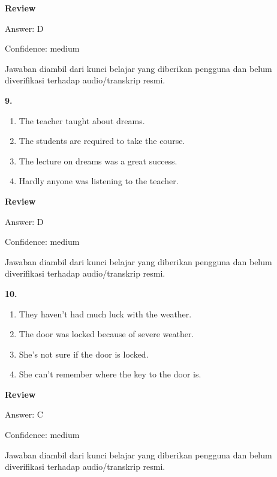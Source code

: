 \documentclass[12pt]{article}
\begin{document}
\par
\begingroup
\setlength{\parskip}{0pt}
\setlength{\parindent}{0pt}
\textbf{Review}\par
Answer: D\par
Confidence: medium\par
Jawaban diambil dari kunci belajar yang diberikan pengguna dan belum diverifikasi terhadap audio/transkrip resmi.\par
\endgroup
\par
\vspace{0.25\baselineskip}
\noindent\textbf{9.}
\begin{enumerate}[label=(\Alph*),leftmargin=*,itemsep=0.2em]
\item The teacher taught about dreams.
\item The students are required to take the course.
\item The lecture on dreams was a great success.
\item Hardly anyone was listening to the teacher.
\end{enumerate}
\par
\begingroup
\setlength{\parskip}{0pt}
\setlength{\parindent}{0pt}
\textbf{Review}\par
Answer: D\par
Confidence: medium\par
Jawaban diambil dari kunci belajar yang diberikan pengguna dan belum diverifikasi terhadap audio/transkrip resmi.\par
\endgroup
\par
\vspace{0.25\baselineskip}
\noindent\textbf{10.}
\begin{enumerate}[label=(\Alph*),leftmargin=*,itemsep=0.2em]
\item They haven't had much luck with the weather.
\item The door was locked because of severe weather.
\item She's not sure if the door is locked.
\item She can't remember where the key to the door is.
\end{enumerate}
\par
\begingroup
\setlength{\parskip}{0pt}
\setlength{\parindent}{0pt}
\textbf{Review}\par
Answer: C\par
Confidence: medium\par
Jawaban diambil dari kunci belajar yang diberikan pengguna dan belum diverifikasi terhadap audio/transkrip resmi.\par
\end{document}
